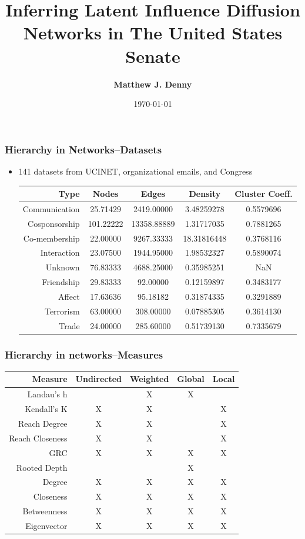 \documentclass[xcolor={table}]{beamer}
\title{Inferring Latent Influence Diffusion Networks in The United States Senate}
\author{\Large\textbf{Matthew J. Denny}}
\institute{\Large Penn State University ---
 \texttt{mzd5530@psu.edu}\\
 \color{blue}\texttt{www.mjdenny.com}\\
 \texttt{@MatthewJDenny}
}
\date{ \today }
\begin{document}






\begin{frame}\frametitle{Hierarchy in Networks--Datasets}
\begin{itemize}
	\item 141 datasets from UCINET, organizational emails, and Congress
	\vspace{.2in}
	\scriptsize
	\begin{table}
		\begin{tabular}{| r || c | c | c | c |}
			\hline
			Type & Nodes & Edges & Density & Cluster Coeff. \\
			\hline
			Communication & 25.71429  &2419.00000  &3.48259278 &             0.5579696 \\
			Cosponsorship &101.22222 &13358.88889  &1.31717035  &            0.7881265\\
			Co-membership & 22.00000  &9267.33333 &18.31816448  &            0.3768116\\
			Interaction & 23.07500 & 1944.95000 & 1.98532327   &           0.5890074\\
			Unknown & 76.83333 & 4688.25000 & 0.35985251   &              
			   NaN\\
			Friendship & 29.83333  &  92.00000 & 0.12159897    &          0.3483177\\
			Affect & 17.63636  &  95.18182 & 0.31874335      &
			        0.3291889\\
			Terrorism & 63.00000 &  308.00000 & 0.07885305    &          0.3614130\\
			Trade & 24.00000 &  285.60000 & 0.51739130     &
			         0.7335679\\
			\hline
		\end{tabular}
	\end{table}
\end{itemize}
\end{frame}

\begin{frame}\frametitle{Hierarchy in networks--Measures}
\begin{table}
	\begin{tabular}{| r || c | c | c | c |}
		\hline
		Measure & Undirected & Weighted & Global & Local \\
		\hline
		Landau's h & & X& X& \\
		Kendall's K & X& X& &X\\
		Reach Degree & X& X& &X\\
		Reach Closeness & X& X& &X\\
		GRC & X& X& X&X\\
		Rooted Depth & & & X&\\
		Degree & X& X& X&X\\
		Closeness & X& X& X&X\\
		Betweenness & X& X& X&X\\
		Eigenvector &  X& X& X& X \\
		\hline
	\end{tabular}
\end{table}
\end{frame}
\end{document}
